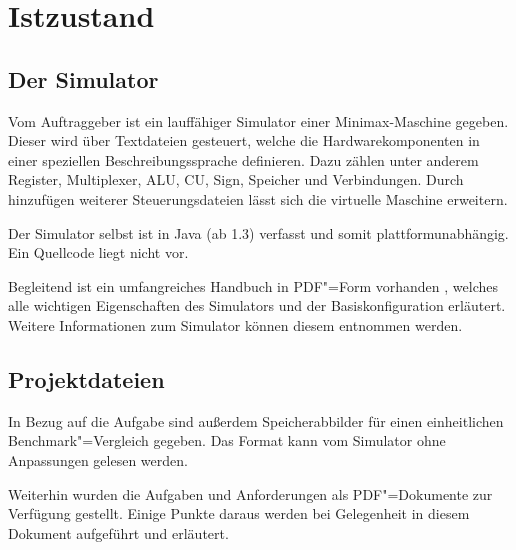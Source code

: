 \chapter{Istzustand}
\label{chapter:Pflichtenheft-Istzustand}

\section{Der Simulator}
\label{chapter:Pflichtenheft-Istzustand-Simulator}

Vom Auftraggeber ist ein lauffähiger Simulator einer Minimax-Maschine gegeben. Dieser wird über Textdateien gesteuert, welche die Hardwarekomponenten in einer speziellen Beschreibungssprache definieren. Dazu zählen unter anderem Register, Multiplexer, ALU, CU, Sign, Speicher und Verbindungen. Durch hinzufügen weiterer Steuerungsdateien lässt sich die virtuelle Maschine erweitern.

Der Simulator selbst ist in Java (ab 1.3) verfasst und somit plattformunabhängig. Ein Quellcode liegt nicht vor.

Begleitend ist ein umfangreiches Handbuch in PDF"=Form vorhanden \cite{minimax-handbuch}, welches alle wichtigen Eigenschaften des Simulators und der Basiskonfiguration erläutert. Weitere Informationen zum Simulator können diesem entnommen werden.


\section{Projektdateien}
\label{chapter:Pflichtenheft-Istzustand-Projektdateien}

In Bezug auf die Aufgabe sind außerdem Speicherabbilder für einen einheitlichen Benchmark"=Vergleich gegeben. Das Format kann vom Simulator ohne Anpassungen gelesen werden.

Weiterhin wurden die Aufgaben und Anforderungen als PDF"=Dokumente zur Verfügung gestellt. Einige Punkte daraus werden bei Gelegenheit in diesem Dokument aufgeführt und erläutert.
